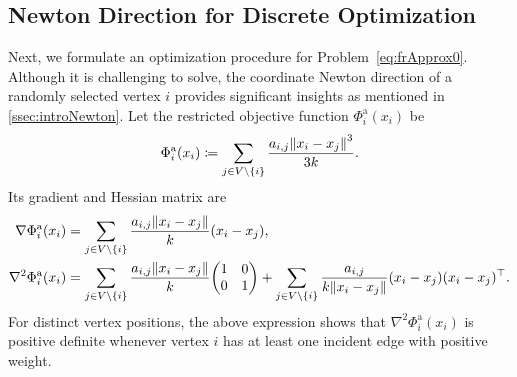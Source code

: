 \documentclass{jgaa-art}
\newcommand{\defeq}{\coloneqq}
\begin{document}
\subsection{Newton Direction for Discrete Optimization}
\label{ssec:newtonDirection}

Next, we formulate an optimization procedure for Problem~\eqref{eq:frApprox0}.
Although it is challenging to solve, the coordinate Newton direction of a randomly selected vertex $i$ provides significant insights as mentioned in \cref{ssec:introNewton}.
Let the restricted objective function $\Phi^{\mathrm{a}}_{i}(x_{i})$ be
\begin{equation*}
  \Phi^{\mathrm{a}}_{i}(x_{i}) \defeq \sum_{j \in V \setminus \{i\}}\frac{a_{i,j}\norm{x_i - x_j}^{3}}{3k}.
\end{equation*}
Its gradient and Hessian matrix are
\begin{align*}
  \nabla \Phi^{\mathrm{a}}_{i}(x_{i})    & = \sum_{j \in V \setminus \{i\}}\frac{a_{i,j}\norm{x_i - x_j}}{k}(x_{i}- x_{j}),                             \\
  \nabla^{2}\Phi^{\mathrm{a}}_{i}(x_{i}) & = \sum_{j \in V \setminus \{i\}}\frac{a_{i,j}\norm{x_i - x_j}}{k}\mqty(1                                 & 0 \\
  0                                      & 1) + \sum_{j \in V \setminus \{i\}}\frac{a_{i,j}}{k\norm{x_i - x_j}}(x_{i}- x_{j})(x_{i}- x_{j})^{\top}.
\end{align*}
For distinct vertex positions, the above expression shows that $\nabla^{2}\Phi^{\mathrm{a}}_{i}(x_{i})$ is positive definite whenever vertex $i$ has at least one incident edge with positive weight.
\end{document}
